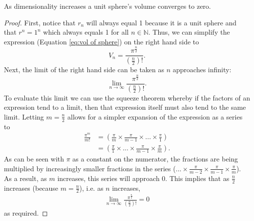 \begin{lemma}\label{lemma:unit sphere volume tends to zero}
    As dimensionality increases a unit sphere's volume converges to zero.
\end{lemma}
\begin{proof}
    First, notice that $r_n$ will always equal 1 because it is a unit sphere and that $r^n=1^n$ which always equals 1 for all $n \in \mathbb{N}$. Thus, we can simplify the expression (Equation \ref{eq:vol of sphere}) on the right hand side to
    \begin{equation*}
        V_n=\frac{\pi^{\frac{n}{2}}}{\left(\frac{n}{2}\right)!}.
    \end{equation*}
    Next, the limit of the right hand side can be taken as $n$ approaches infinity:
    \begin{equation*}
        \lim_{n\to\infty}\frac{\pi^{\frac{n}{2}}}{\left(\frac{n}{2}\right)!}.
    \end{equation*}
    To evaluate this limit we can use the squeeze theorem whereby if the factors of an expression tend to a limit, then that expression itself must also tend to the same limit. Letting $m=\frac{n}{2}$ allows for a simpler expansion of the expression as a series to
    \begin{align*}
        \frac{\pi ^ m}{m!} &= \left( \frac{\pi}{m} \times \frac{\pi}{m-1} \times ... \times \frac{\pi}{1}\right)\\
        &= \left( \frac{\pi}{1} \times ... \times \frac{\pi}{m-1} \times \frac{\pi}{m} \right).
    \end{align*}
    As can be seen with $\pi$ as a constant on the numerator, the fractions are being multiplied by increasingly smaller fractions in the series ($... \times \frac{\pi}{m-2} \times \frac{\pi}{m-1} \times \frac{\pi}{m}$). As a result, as $m$ increases, this series will approach 0. This implies that as $\frac{n}{2}$ increases (because $m=\frac{n}{2}$), i.e. as $n$ increases,
    \begin{align*}
         \lim_{n\to\infty}\frac{\pi^{\frac{n}{2}}}{\left(\frac{n}{2}\right)!}=0
    \end{align*}
    as required.
\end{proof}

